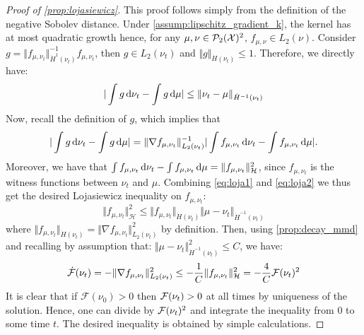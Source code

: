 \begin{proof}[Proof of \cref{prop:lojasiewicz}]\label{proof:prop:lojasiewicz}
	This proof follows simply from the definition of the negative Sobolev distance. Under \cref{assump:lipschitz_gradient_k}, the kernel has at most quadratic growth hence, for any $\mu,\nu \in \mathcal{P}_2({{\mathcal X}})^2$, $f_{\mu,\nu}\in L_2(\nu)$. Consider $g = \Vert f_{\mu, \nu_t}\Vert^{-1}_{\dot{H}^1(\nu_t)} f_{\mu, \nu_t}$, then $g\in L_2(\nu_t)$ and $\Vert g \Vert_{\dot{H}(\nu_t)}\leq 1$. Therefore, we directly have:
	\begin{align}\label{eq:loja1}
	\vert \int g \mathop{}\!\mathrm{d} \nu_t - \int g \mathop{}\!\mathrm{d} \mu  \vert \leq \Vert \nu_t - \mu\Vert_{\dot{H}^{-1}(\nu_t)} 
	\end{align}
	Now, recall the definition of $g$, which implies that
	\begin{equation}\label{eq:loja2}
	\vert \int g \mathop{}\!\mathrm{d} \nu_t - \int g \mathop{}\!\mathrm{d} \mu  \vert = \Vert \nabla f_{\mu, \nu_t}\Vert^{-1}_{L_2(\nu_t)} \vert \int f_{\mu, \nu_t}\mathop{}\!\mathrm{d} \nu_t-\int f_{\mu, \nu_t} \mathop{}\!\mathrm{d} \mu \vert.
	\end{equation}
	Moreover,  we have that $\int f_{\mu, \nu_t}\mathop{}\!\mathrm{d} \nu_t-\int f_{\mu,\nu_t}\mathop{}\!\mathrm{d} \mu = \Vert f_{\mu, \nu_t}\Vert^2_{{{\mathcal H}}}$, since $f_{\mu, \nu_t}$  is the witness functions between $\nu_t$ and $\mu$. Combining \eqref{eq:loja1} and \eqref{eq:loja2} we thus get the desired Lojasiewicz inequality on $f_{\mu,\nu_t}$:
	\begin{equation}
	\Vert f_{\mu,\nu_t} \Vert^2_{\mathcal{H}} \leq \Vert f_{\mu,\nu_t} \Vert_{\dot{H}(\nu_t)} \Vert  \mu -\nu_t\Vert_{\dot{H}^{-1}(\nu_t)}  
	\end{equation}
	where $\Vert f_{\mu,\nu_t} \Vert_{\dot{H}(\nu_t)}=\Vert \nabla f_{\mu, \nu_t} \Vert^2_{L_2(\nu_t)}$ by definition. Then, 
	using \cref{prop:decay_mmd} and recalling by assumption that: $\Vert \mu - \nu_t \Vert^2_{\dot{H}^{-1}(\nu_t)} \le C$, we have:  
	\begin{align}\label{eq:PL_inequality}
	\dot{{{\mathcal F}}}(\nu_t) = - \Vert \nabla f_{\mu, \nu_t} \Vert^2_{L_2(\nu_t)} \leq -\frac{1}{C}\Vert f_{\mu,\nu_t} \Vert^2_{\mathcal{H}}= -\frac{4}{C}{{\mathcal F}}(\nu_t)^2	
	\end{align}
	It is clear that if $\mathcal{F}(\nu_0)>0$ then ${{\mathcal F}}(\nu_t)>0$ at all times by uniqueness of the solution. Hence, one can divide by ${{\mathcal F}}(\nu_t)^2$ and integrate the inequality from $0$ to some time $t$. The desired inequality is obtained by simple calculations.


\end{proof}
